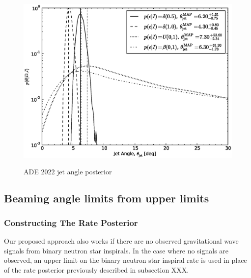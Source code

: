 \documentclass[twocolumn,nofootinbib]{revtex4-1}
\begin{document}
\begin{figure}
\centering
{\includegraphics[width=\linewidth]{jet_angle_posterior_aligo_2022_real.eps}}
\caption{ADE 2022 jet angle posterior}
\end{figure}




\subsection{Beaming angle limits from upper limits}
\label{sec:beaming_limits}

\subsubsection{Constructing The Rate Posterior}

Our proposed approach also works if there are no observed 
gravitational wave signals from binary neutron star inspirals. In the 
case where no signals are observed, an upper limit on the binary
neutron star inspiral rate is used in place of the rate posterior 
previously described in subsection XXX.
\end{document}

